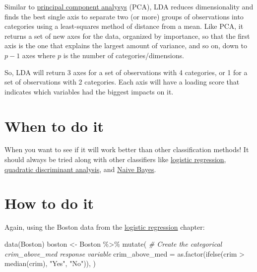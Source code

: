 \documentclass[
]{book}
\newenvironment{Shaded}{\begin{snugshade}}{\end{snugshade}}
\newcommand{\AttributeTok}[1]{\textcolor[rgb]{0.77,0.63,0.00}{#1}}
\newcommand{\CommentTok}[1]{\textcolor[rgb]{0.56,0.35,0.01}{\textit{#1}}}
\newcommand{\FunctionTok}[1]{\textcolor[rgb]{0.00,0.00,0.00}{#1}}
\newcommand{\NormalTok}[1]{#1}
\newcommand{\OtherTok}[1]{\textcolor[rgb]{0.56,0.35,0.01}{#1}}
\newcommand{\SpecialCharTok}[1]{\textcolor[rgb]{0.00,0.00,0.00}{#1}}
\newcommand{\StringTok}[1]{\textcolor[rgb]{0.31,0.60,0.02}{#1}}
\begin{document}
Similar to \protect\hyperlink{principal-component-analysis}{principal component analysys} (PCA), LDA reduces dimensionality and finds the best single axis to separate two (or more) groups of observations into categories using a least-squares method of distance from a mean. Like PCA, it returns a set of new axes for the data, organized by importance, so that the first axis is the one that explains the largest amount of variance, and so on, down to \(p - 1\) axes where \(p\) is the number of categories/dimensions.

So, LDA will return 3 axes for a set of observations with 4 categories, or 1 for a set of observations with 2 categories. Each axis will have a loading score that indicates which variables had the biggest impacts on it.

\hypertarget{when-to-do-it-3}{%
\section{When to do it}\label{when-to-do-it-3}}

When you want to see if it will work better than other classification methods! It should always be tried along with other classifiers like \protect\hyperlink{logistic-regression}{logistic regression}, \protect\hyperlink{quadratic-discriminant-analysis}{quadratic discriminant analysis}, and \protect\hyperlink{naive-bayes}{Naive Bayes}.

\hypertarget{how-to-do-it-3}{%
\section{How to do it}\label{how-to-do-it-3}}

Again, using the Boston data from the \protect\hyperlink{logistic-regression}{logistic regression} chapter:

\begin{Shaded}
\begin{Highlighting}[]
\FunctionTok{data}\NormalTok{(Boston)}
\NormalTok{boston }\OtherTok{\textless{}{-}}\NormalTok{ Boston }\SpecialCharTok{\%\textgreater{}\%}
  \FunctionTok{mutate}\NormalTok{(}
    \CommentTok{\# Create the categorical crim\_above\_med response variable}
    \AttributeTok{crim\_above\_med =} \FunctionTok{as.factor}\NormalTok{(}\FunctionTok{ifelse}\NormalTok{(crim }\SpecialCharTok{\textgreater{}} \FunctionTok{median}\NormalTok{(crim), }\StringTok{"Yes"}\NormalTok{, }\StringTok{"No"}\NormalTok{)),}
\NormalTok{  )}
\end{Highlighting}
\end{Shaded}
\end{document}
